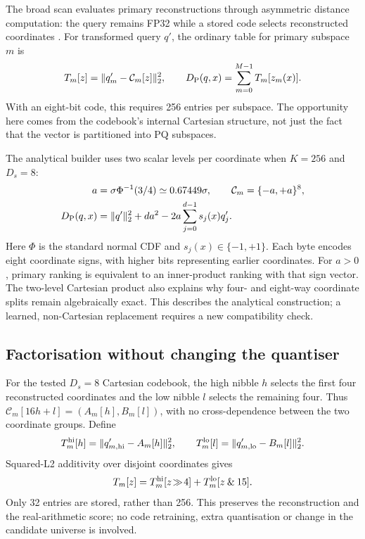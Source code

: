The broad scan evaluates primary reconstructions through asymmetric
distance computation: the query remains FP32 while a stored code selects
reconstructed coordinates \cite{pq,jhq}. For transformed query $q'$, the
ordinary table for primary subspace $m$ is
\begin{equation}
 T_m[z]=\|q'_m-\mathcal C_m[z]\|_2^2,\qquad
 D_{\mathrm{P}}(q,x)=\sum_{m=0}^{M-1}T_m[z_m(x)].
 \label{eq:5-primary-lut}
\end{equation}
With an eight-bit code, this requires 256 entries per subspace. The
opportunity here comes from the codebook's internal Cartesian structure,
not just the fact that the vector is partitioned into PQ subspaces.

The analytical builder uses two scalar levels per coordinate when
$K=256$ and $D_s=8$:
\begin{equation}
 \begin{aligned}
 a&=\sigma\Phi^{-1}(3/4)\simeq0.67449\sigma,\qquad
 \mathcal C_m=\{-a,+a\}^{8},\\
 D_{\mathrm{P}}(q,x)&=\|q'\|_2^2+da^2
       -2a\sum_{j=0}^{d-1}s_j(x)q'_j.
 \end{aligned}
 \label{eq:5-sign-codebook}
\end{equation}
Here $\Phi$ is the standard normal CDF and $s_j(x)\in\{-1,+1\}$.
Each byte encodes eight coordinate signs, with higher bits representing
earlier coordinates. For $a>0$, primary ranking is equivalent to an
inner-product ranking with that sign vector. The two-level Cartesian
product also explains why four- and eight-way coordinate splits remain
algebraically exact. This describes the analytical construction; a
learned, non-Cartesian replacement requires a new compatibility check.

\subsection{Factorisation without changing the quantiser}

For the tested $D_s=8$ Cartesian codebook, the high nibble $h$ selects
the first four reconstructed coordinates and the low nibble $l$ selects
the remaining four. Thus $\mathcal C_m[16h+l]=(A_m[h],B_m[l])$, with no
cross-dependence between the two coordinate groups. Define
\begin{equation}
 T_m^{\rm hi}[h]=\|q'_{m,\rm hi}-A_m[h]\|_2^2,\qquad
 T_m^{\rm lo}[l]=\|q'_{m,\rm lo}-B_m[l]\|_2^2.
 \label{eq:5-lut-halves}
\end{equation}
Squared-L2 additivity over disjoint coordinates gives
\begin{equation}
 T_m[z]=T_m^{\rm hi}[z\!\gg\!4]
        +T_m^{\rm lo}[z\mathbin{\&}15].
 \label{eq:5-lut-factorisation}
\end{equation}
Only 32 entries are stored, rather than 256. This preserves the
reconstruction and the real-arithmetic score; no code retraining,
extra quantisation or change in the candidate universe is involved.


